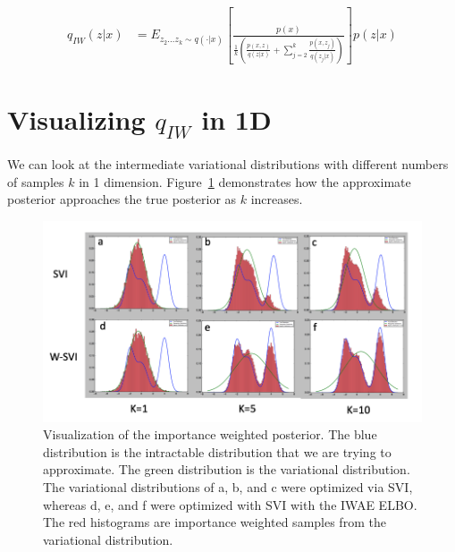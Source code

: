 \documentclass{article} %
\begin{document}
\begin{align} 
    q_{IW}(z|x) &= E_{z_{2}...z_{k} \sim q(\cdot |x)} \left[ \frac{p(x)}{  \frac{1}{k} \left( \frac{p(x,z)}{q(z|x)}+ \sum_{j=2}^k \frac{p(x,z_j)}{q(z_j|x)} \right) } \right] p(z|x) \label{marg1} %
\end{align}




\section{Visualizing \texorpdfstring{$q_{IW}$}{} in 1D}

We can look at the intermediate variational distributions with different numbers of samples $k$ in 1 dimension.
Figure~\ref{viz2} demonstrates how the approximate posterior approaches the true posterior as $k$ increases. 

\begin{figure}[H]
  \centering
      \includegraphics[width=1.\textwidth]{figs/posteriors.png}
  \caption{Visualization of the importance weighted posterior. The blue distribution is the intractable distribution that we are trying to approximate. The green distribution is the variational distribution. The variational distributions of a, b, and c were optimized via SVI, whereas d, e, and f were optimized with SVI with the IWAE ELBO. The red histograms are importance weighted samples from the variational distribution.}
  \label{viz2}
\end{figure}




        
\end{document}

